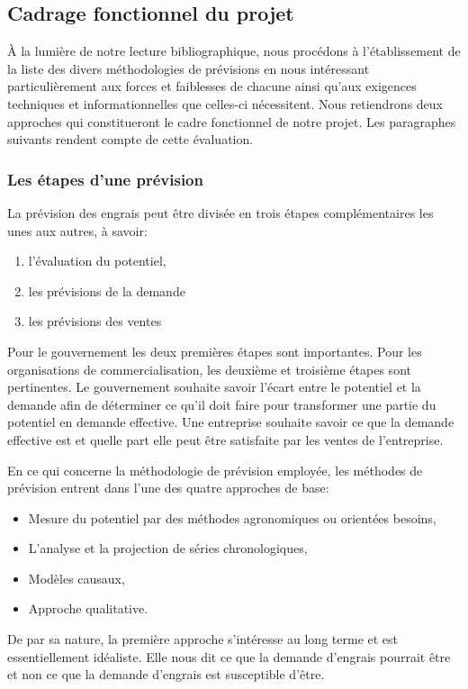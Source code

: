 	\subsection{Cadrage fonctionnel du projet}
	À la lumière de notre lecture bibliographique, nous procédons à l'établissement de la liste des divers méthodologies de prévisions en nous intéressant particulièrement aux forces et faiblesses de chacune ainsi qu'aux exigences techniques et informationnelles que celles-ci nécessitent. Nous retiendrons deux approches qui constitueront le cadre fonctionnel de notre projet. Les paragraphes suivants rendent compte de cette évaluation.
	\subsubsection{Les étapes d'une prévision}
	La prévision des engrais peut être divisée en trois étapes complémentaires les unes aux autres, à savoir:\begin{enumerate}
	\item l'évaluation du potentiel,
	\item les prévisions de la demande
	\item les prévisions des ventes
	\end{enumerate}
	Pour le gouvernement les deux premières étapes sont importantes. Pour les organisations de commercialisation, les deuxième et troisième étapes sont pertinentes. Le gouvernement souhaite savoir l'écart entre le potentiel et la demande afin de déterminer ce qu'il doit faire pour transformer une partie du potentiel en demande effective. Une entreprise souhaite savoir ce que la demande effective est et quelle part elle peut être satisfaite par les ventes de l'entreprise.\par
	En ce qui concerne la méthodologie de prévision employée, les méthodes de prévision entrent dans l'une des quatre approches de base:\begin{itemize}
	\item Mesure du potentiel par des méthodes agronomiques ou orientées besoins, 
	\item L'analyse et la projection de séries chronologiques,
	\item Modèles causaux,
	\item Approche qualitative.
	\end{itemize}\par
	De par sa nature, la première approche s’intéresse au long terme et est essentiellement idéaliste. Elle nous dit ce que la demande d'engrais pourrait être et non ce que la demande d'engrais est susceptible d'être.\par

